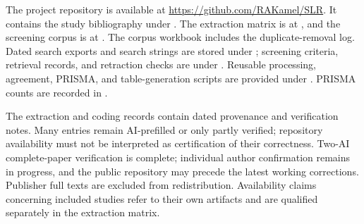 The project repository is available at \url{https://github.com/RAKamel/SLR}. It contains the study bibliography under . The extraction matrix is at , and the screening corpus is at . The corpus workbook includes the duplicate-removal log. Dated search exports and search strings are stored under ; screening criteria, retrieval records, and retraction checks are under . Reusable processing, agreement, PRISMA, and table-generation scripts are provided under . PRISMA counts are recorded in .

The extraction and coding records contain dated provenance and verification notes. Many entries remain AI-prefilled or only partly verified; repository availability must not be interpreted as certification of their correctness. Two-AI complete-paper verification is complete; individual author confirmation remains in progress, and the public repository may precede the latest working corrections. Publisher full texts are excluded from redistribution. Availability claims concerning included studies refer to their own artifacts and are qualified separately in the extraction matrix.
